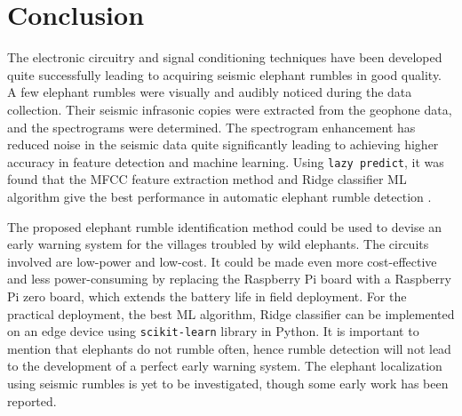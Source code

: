 \documentclass[applsci,article,accept,moreauthors,pdftex]{Definitions/mdpi}
\begin{document}
\section{Conclusion}
The electronic circuitry and signal conditioning techniques have been developed quite successfully leading to acquiring seismic elephant rumbles in good quality. A few elephant rumbles were visually and audibly noticed during the data collection. Their seismic infrasonic copies were extracted from the geophone data, and the spectrograms were determined. The spectrogram enhancement has reduced noise in the seismic data quite significantly leading to achieving higher accuracy in feature detection and machine learning. Using {\tt lazy predict}, it was found that the MFCC feature extraction method and Ridge classifier ML algorithm give the best performance in automatic elephant rumble detection
.\par
The proposed elephant rumble identification method could be used to devise an early warning system for the villages troubled by wild elephants. The circuits involved are low-power and low-cost. It could be made even more cost-effective and less power-consuming by replacing the Raspberry Pi board with a Raspberry Pi zero board, which extends the battery life in field deployment. For the practical deployment, the best ML algorithm, Ridge classifier can be implemented on an edge device using {\tt scikit-learn} library in Python. It is important to mention that elephants do not rumble often, hence rumble detection will not lead to the development of a perfect early warning system. The elephant localization using seismic rumbles is yet to be investigated, though some early work has been reported.
		

			
\end{document}
